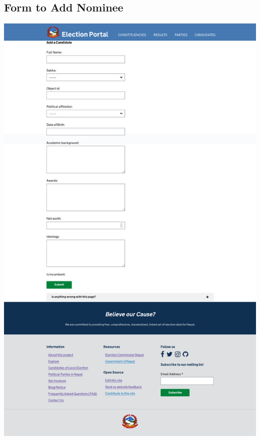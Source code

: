 \documentclass[12pt, a4paper, titlepage]{report}
\begin{document}
\subsection{Form to Add Nominee}
\begin{center}
\includegraphics[scale=0.25]{Form_To_Add_Candidate.png}
\end{center}
\end{document}

